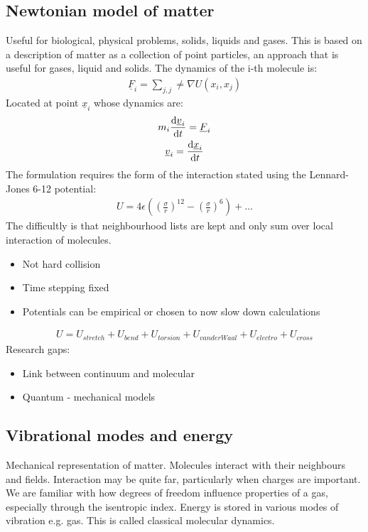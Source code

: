 \subsection{Newtonian model of matter}
Useful for biological, physical problems, solids, liquids and gases. This is based on a description of matter as a collection of point particles, an approach that is useful for gases, liquid and solids. The dynamics of the i-th molecule is:
\begin{gather}
	\underline{F}_i = \sum_{j,j} \neq \nabla U\left(x_i,x_j\right)
\end{gather}
Located at point $\underline{x}_i$ whose dynamics are:
\begin{gather}
	m_i \dfrac{\dif \underline{v}_i}{\dif t} = \underline{F}_i\\
	\underline{v}_i = \frac{\dif \underline{x}_i}{\dif t}
\end{gather}
The formulation requires the form of the interaction stated using the Lennard-Jones 6-12 potential:
\begin{gather}
	U = 4 \epsilon \left(\left(\frac{\sigma}{r}\right)^{12} - \left(\frac{\sigma}{r}\right)^6\right) + \dots
\end{gather}
The difficultly is that neighbourhood lists are kept and only sum over local interaction of molecules.
\begin{itemize}
	\item Not hard collision
	\item Time stepping fixed
	\item Potentials can be empirical or chosen to now slow down calculations
\end{itemize}
\begin{gather}
	U = U_{stretch} + U_{bend} + U_{torsion} + U_{vanderWaal} + U_{electro} + U_{cross}
\end{gather}
Research gaps:
\begin{itemize}
	\item Link between continuum and molecular
	\item Quantum - mechanical models
\end{itemize}
\subsection{Vibrational modes and energy}
Mechanical representation of matter. Molecules interact with their neighbours and fields. Interaction may be quite far, particularly when charges are important. We are familiar with how degrees of freedom influence properties of a gas, especially through the isentropic index. Energy is stored in various modes of vibration e.g. gas. This is called classical molecular dynamics.
